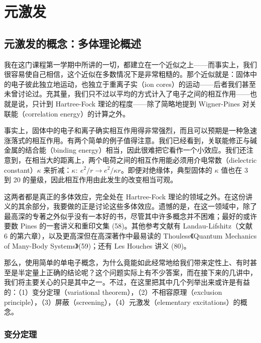 
\chapter{元激发}

\section{元激发的概念：多体理论概述}

我在这门课程第一学期中所讲的一切，都建立在一个近似之上——而事实上，我们很容易使自己相信，这个近似在多数情况下是非常粗糙的。那个近似就是：固体中的电子彼此独立地运动，也独立于重离子实（ion cores）的运动——后者我们甚至未曾讨论过。充其量，我们只不过以平均的方式计入了电子之间的相互作用——也就是说，只计到 Hartree-Fock 理论的程度——除了简略地提到 Wigner-Pines 对关联能（correlation energy）的计算之外。

事实上，固体中的电子和离子确实相互作用得非常强烈，而且可以预期是一种急速涨落式的相互作用。有两个简单的例子值得注意。我们已经看到，关联能修正与碱金属的结合能（binding energy）相当，因此很难把它看作一个小效应。我们还注意到，在相当大的距离上，两个电荷之间的相互作用能必须用介电常数（dielectric constant）$\kappa$ 来折减：$\kappa:\ e^{2}/r \to e^{2}/\kappa r$。即便对绝缘体，典型固体的 $\kappa$ 值也在 3 到 20 的量级，因此相互作用由此发生的改变相当可观。

这两者都是真正的多体效应，完全处在 Hartree-Fock 理论的领域之外。在这份讲义的其余部分，我要做的正是讨论这些多体效应。遗憾的是，在这一领域中，除了最高深的专著之外似乎没有一本好的书，尽管其中许多概念并不困难；最好的或许要数 Pines 的一套讲义和重印文集 (58)。其他参考文献有 Landau-Lifshitz（文献 6 的第六章），以及更高深但在高深著作中最易读的 Thouless《Quantum Mechanics of Many-Body Systems》(59)；还有 Les Houches 讲义 (80)。

那么，使用简单的单电子概念，为什么竟能如此经常地给我们带来定性上、有时甚至是半定量上正确的结论呢？这个问题实际上有不少答案，而在接下来的几讲中，我们将主要关心的只是其中之一。不过，在这里把其中几个列举出来或许是有益的：（1）变分定理（variational theorem），（2）不相容原理（exclusion principle），（3）屏蔽（screening），（4）元激发（elementary excitations）的概念。

\subsection{变分定理}

